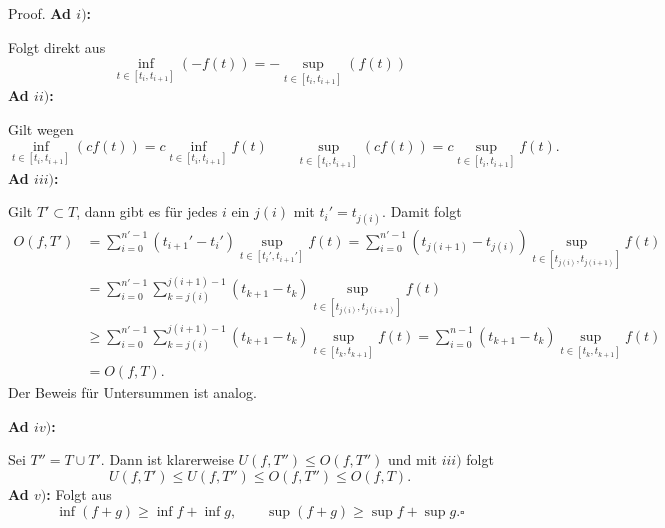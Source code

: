 \documentclass[letterpaper,10pt,english]{jupyterBook}
\begin{document}
\begin{emphBox}{}{}
Proof. \textbf{Ad \(i)\):}

Folgt direkt aus
\begin{equation*}
\inf_{t \in [t_i,t_{i+1}]}(-f(t)) = - \sup_{t \in [t_i,t_{i+1}]}(f(t))
\end{equation*}
\textbf{Ad \(ii)\):}

Gilt wegen
\begin{equation*}
 \inf_{t \in [t_i,t_{i+1}]} (c f(t)) = c \inf_{t \in [t_i,t_{i+1}]} f(t) \qquad \sup_{t \in [t_i,t_{i+1}]} (c f(t)) = c \sup_{t \in [t_i,t_{i+1}]} f(t).
\end{equation*}
\textbf{Ad \(iii)\):}

Gilt \(T' \subset T\), dann gibt es für jedes \(i\) ein \(j(i)\) mit \(t_i' =t_{j(i)}\). Damit folgt
\begin{align*} O(f,T') &= \sum_{i=0}^{n'-1} (t_{i+1}' - t_i') \sup_{t \in  [t_i',t_{i+1}']} f(t) =\sum_{i=0}^{n'-1} (t_{j(i+1)} - t_{j(i)}) \sup_{t \in  [t_{j(i)},t_{j(i+1)}]} f(t) \\
&= \sum_{i=0}^{n'-1} \sum_{k=j(i)}^{j(i+1)-1} (t_{k+1} - t_{k}) \sup_{t \in  [t_{j(i)},t_{j(i+1)}]} f(t)  \\
&\geq \sum_{i=0}^{n'-1} \sum_{k=j(i)}^{j(i+1)-1} (t_{k+1} - t_{k}) \sup_{t \in  [t_{k},t_{k+1}]} f(t)   =\sum_{i=0}^{n-1} (t_{k+1} - t_{k}) \sup_{t \in  [t_{k},t_{k+1}]} f(t)  \\ &= O(f,T).
\end{align*}
Der Beweis für Untersummen ist analog.

\textbf{Ad \(iv)\):}

Sei \(T''= T \cup T'\). Dann ist klarerweise \(U(f,T'') \leq O(f,T'')\) und mit \(iii)\) folgt
\begin{equation*}
 U(f,T') \leq U(f,T'') \leq O(f,T'') \leq O(f,T) .
\end{equation*}
\textbf{Ad \(v)\):}
Folgt aus
\begin{equation*}
 \inf (f+g) \geq \inf f + \inf g, \qquad \sup (f+g) \geq \sup f + \sup g.  \square
\end{equation*}\end{emphBox}
\end{document}
